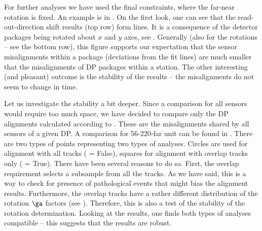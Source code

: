 For further analyses we have used the final constraints, where the far-near rotation is fixed. An example is in . On the first look, one can see that the read-out-direction shift results (top row) form lines. It is a consequence of the detector packages being rotated about $x$ and $y$ axes, see . Generally (also for the rotations -- see the bottom row), this figure supports our expectation that the sensor misalignments within a package (deviations from the fit lines) are much smaller that the misalignments of DP packages within a station. The other interesting (and pleasant) outcome is the stability of the results -- the misalignments do not seem to change in time.


Let us investigate the stability a bit deeper. Since a comparison for all sensors would require too much space, we have decided to compare only the DP alignments calculated according to . These are the misalignments shared by all sensors of a given DP. A comparison for 56-220-far unit can be found in . There are two types of points representing two types of analyses. Circles are used for alignment with all tracks ( = False), squares for alignment with overlap tracks only ( = True). There have been several reasons to do so. First, the overlap requirement selects a subsample from all the tracks. As we have said, this is a way to check for presence of pathological events that might bias the alignment results. Furthermore, the overlap tracks have a rather different distribution of the rotation $\ga$ factors (see ). Therefore, this is also a test of the stability of the rotation determination. Looking at the results, one finds both types of analyses compatible -- this suggests that the results are robust.


